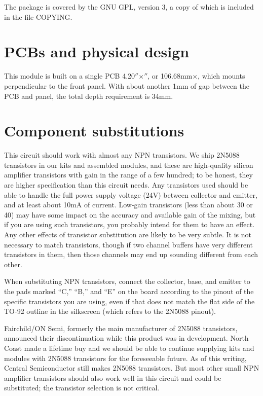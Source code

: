 The package is covered by the GNU GPL, version 3, a copy of which is
included in the file COPYING.

\section{PCBs and physical design}

This module is built on a single PCB
4.20$''$\linebreak[0]$\times$$''$, or
106.68mm\linebreak[0]$\times$\linebreak[0]33.02mm, which mounts
perpendicular to the front panel.  With about another 1mm
of gap between the PCB and panel, the total depth requirement is 34mm.

\section{Component substitutions}

This circuit should work with almost any NPN transistors.  We ship
2N5088 transistors in our kits and assembled modules, and these are
high-quality silicon amplifier transistors with gain in the range of a few
hundred; to be honest, they are higher specification than this circuit
needs.  Any transistors used should be able to handle the full power supply
voltage (24V) between collector and emitter, and at least about 10mA of
current.  Low-gain transistors (less than about 30 or 40) may have some
impact on the accuracy and available gain of the mixing, but if you are
using such transistors, you probably intend for them to have an effect.  Any
other effects of transistor substitution are likely to be very subtle.  It
is not necessary to match transistors, though if two channel buffers have
very different transistors in them, then those channels may end up sounding
different from each other.

When substituting NPN transistors, connect the collector, base, and emitter
to the pads marked ``C,'' ``B,'' and ``E'' on the board according to the
pinout of the specific transistors you are using, even if that does not
match the flat side of the TO-92 outline in the silkscreen (which refers to
the 2N5088 pinout).

Fairchild/ON Semi, formerly the main manufacturer of 2N5088 transistors,
announced their discontinuation while this product was in development. 
North Coast made a lifetime buy and we should be able to continue supplying
kits and modules with 2N5088 transistors for the foreseeable future.  As of
this writing, Central Semiconductor still makes 2N5088 transistors.  But
most other small NPN amplifier transistors should also work well in this
circuit and could be substituted; the transistor selection is not critical.

